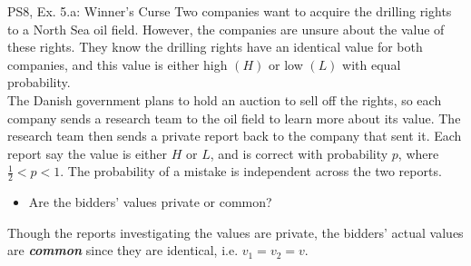 \begin{frame}{PS8, Ex. 5.a: Winner's Curse}
    Two companies want to acquire the drilling rights to a North Sea oil field. However, the companies are unsure about the value of these rights. They know the drilling rights have an identical value for both companies, and this value is either high $(H)$ or low $(L)$ with equal probability.\\\medskip
    The Danish government plans to hold an auction to sell off the rights, so each company sends a research team to the oil field to learn more about its value. The research team then sends a private report back to the company that sent it. Each report say the value is either $H$ or $L$, and is correct with probability $p$, where $\frac{1}{2} < p < 1$. The probability of a mistake is independent across the two reports.
    \begin{itemize}
      \item[(a)] Are the bidders’ values private or common?
    \end{itemize}
    Though the reports investigating the values are private, the bidders' actual values are \textit{\textbf{common}} since they are identical, i.e. $v_1=v_2=v$.
    \vfill\null
\end{frame}


